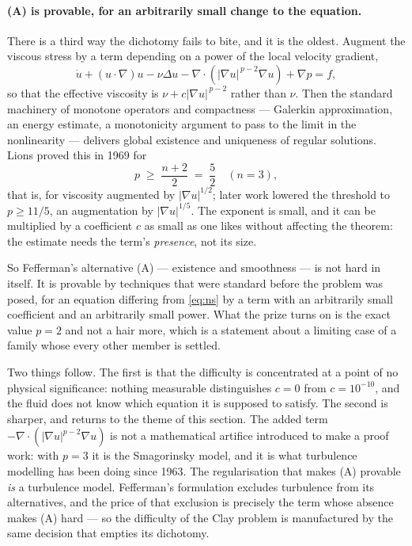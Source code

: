\documentclass[11pt]{article}
\newcommand{\grad}{\nabla}
\begin{document}
\paragraph{(A) is provable, for an arbitrarily small change to the equation.} There is a third way
the dichotomy fails to bite, and it is the oldest. Augment the viscous stress by a term depending on
a power of the local velocity gradient,
\begin{equation}\label{eq:plap}
\dot u + (u\cdot\grad)u - \nu\Delta u
  - \grad\cdot\!\left(|\grad u|^{\,p-2}\grad u\right) + \grad p = f,
\end{equation}
so that the effective viscosity is $\nu + c|\grad u|^{\,p-2}$ rather than $\nu$. Then the standard
machinery of monotone operators and compactness --- Galerkin approximation, an energy estimate, a
monotonicity argument to pass to the limit in the nonlinearity --- delivers global existence and
uniqueness of regular solutions. Lions \cite{lions} proved this in 1969 for
\begin{equation}\label{eq:pcond}
p \;\ge\; \frac{n+2}{2} \;=\; \frac52 \quad (n=3),
\end{equation}
that is, for viscosity augmented by $|\grad u|^{1/2}$; later work lowered the threshold to
$p\ge 11/5$, an augmentation by $|\grad u|^{1/5}$. The exponent is small, and it can be multiplied
by a coefficient $c$ as small as one likes without affecting the theorem: the estimate needs the
term's \emph{presence}, not its size.

So Fefferman's alternative (A) --- existence and smoothness --- is not hard in itself. It is
provable by techniques that were standard before the problem was posed, for an equation differing
from \eqref{eq:ns} by a term with an arbitrarily small coefficient and an arbitrarily small power.
What the prize turns on is the exact value $p=2$ and not a hair more, which is a statement about a
limiting case of a family whose every other member is settled.

Two things follow. The first is that the difficulty is concentrated at a point of no physical
significance: nothing measurable distinguishes $c=0$ from $c=10^{-10}$, and the fluid does not know
which equation it is supposed to satisfy. The second is sharper, and returns to the theme of this
section. The added term $-\grad\cdot(|\grad u|^{p-2}\grad u)$ is not a mathematical artifice
introduced to make a proof work: with $p=3$ it is the Smagorinsky model, and it is what turbulence
modelling has been doing since 1963. The regularisation that makes (A) provable \emph{is} a
turbulence model. Fefferman's formulation excludes turbulence from its alternatives, and the price
of that exclusion is precisely the term whose absence makes (A) hard --- so the difficulty of the
Clay problem is manufactured by the same decision that empties its dichotomy.
\end{document}
